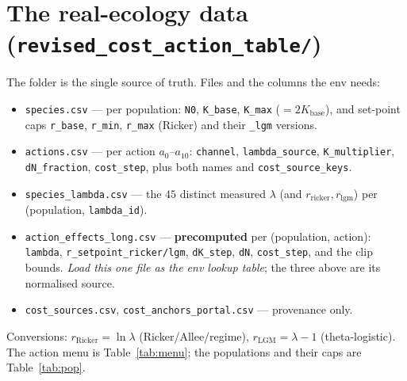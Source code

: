 \documentclass[11pt]{article}
\newcommand{\Kbase}{K_{\mathrm{base}}}
\newcommand{\code}[1]{\texttt{#1}}
\begin{document}
\section{The real-ecology data (\code{revised\_cost\_action\_table/})}
The folder is the single source of truth. Files and the columns the env needs:
\begin{itemize}[nosep,leftmargin=1.4em]
\item \code{species.csv} --- per population: \code{N0}, \code{K\_base}, \code{K\_max}
($=2\Kbase$), and set-point caps \code{r\_base}, \code{r\_min},
\code{r\_max} (Ricker) and their \code{\_lgm} versions.
\item \code{actions.csv} --- per action $a_0$--$a_{10}$: \code{channel},
\code{lambda\_source}, \code{K\_multiplier}, \code{dN\_fraction}, \code{cost\_step},
plus both names and \texttt{cost\_source\_}\allowbreak\texttt{keys}.
\item \texttt{species\_}\allowbreak\texttt{lambda.csv} --- the $45$ distinct measured
$\lambda$ (and
$r_{\mathrm{ricker}},r_{\mathrm{lgm}}$) per (population, \code{lambda\_id}).
\item \texttt{action\_effects\_}\allowbreak\texttt{long.csv} --- \textbf{precomputed} per
(population, action): \code{lambda}, \texttt{r\_setpoint\_}\allowbreak\texttt{ricker/lgm},
\code{dK\_step}, \code{dN}, \code{cost\_step}, and the clip bounds. \emph{Load this
one file as the env lookup table}; the three above are its normalised source.
\item \code{cost\_sources.csv}, \texttt{cost\_anchors\_}\allowbreak\texttt{portal.csv}
--- provenance only.
\end{itemize}
Conversions: $r_{\mathrm{Ricker}}=\ln\lambda$ (Ricker/Allee/regime),
$r_{\mathrm{LGM}}=\lambda-1$ (theta-logistic). The action menu is Table~\ref{tab:menu};
the populations and their caps are Table~\ref{tab:pop}.
\end{document}
